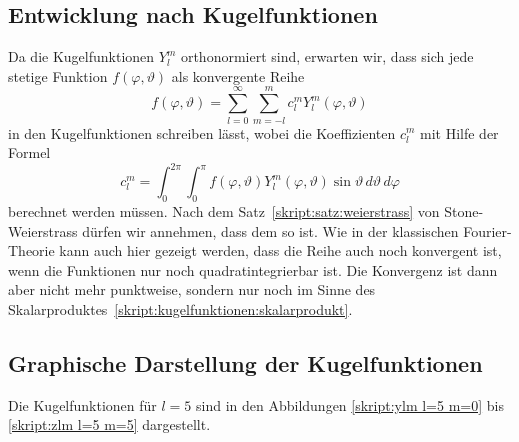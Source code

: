 \subsection{Entwicklung nach Kugelfunktionen}
Da die Kugelfunktionen $Y^m_l$ orthonormiert sind, erwarten wir, dass sich 
jede stetige Funktion $f(\varphi,\vartheta)$ als konvergente Reihe
\begin{equation}
f(\varphi,\vartheta)
=
\sum_{l=0}^\infty
\sum_{m=-l}^m c_l^m Y_l^m(\varphi,\vartheta)
\end{equation}
in den Kugelfunktionen schreiben lässt, wobei die
Koeffizienten $c_l^m$
mit Hilfe der Formel
\begin{equation}
c_l^m
=
\int_{0}^{2\pi}
\int_0^\pi
f(\varphi,\vartheta)Y^m_l(\varphi,\vartheta)
\sin\vartheta
\,d\vartheta
\,d\varphi
\end{equation}
berechnet werden müssen.
Nach dem Satz~\ref{skript:satz:weierstrass} von Stone-Weierstrass
dürfen wir annehmen, dass dem so ist.
Wie in der klassischen Fourier-Theorie kann auch hier gezeigt werden,
dass die Reihe auch noch konvergent ist, wenn die Funktionen nur noch
quadratintegrierbar ist.
Die Konvergenz ist dann aber nicht mehr punktweise, sondern nur noch
im Sinne des Skalarproduktes~\eqref{skript:kugelfunktionen:skalarprodukt}.

\subsection{Graphische Darstellung der Kugelfunktionen}
Die Kugelfunktionen für $l=5$ sind in den Abbildungen
\ref{skript:ylm l=5 m=0} bis \ref{skript:zlm l=5 m=5}
dargestellt.

